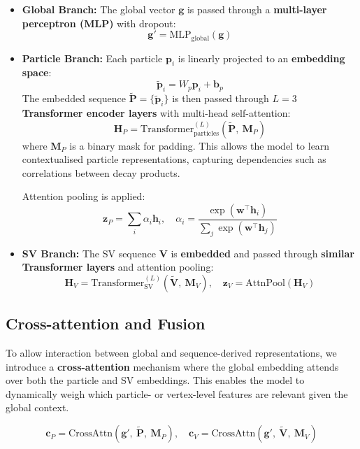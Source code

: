 \documentclass[11pt]{article}
\begin{document}
\begin{itemize}
    \item \textbf{Global Branch:} The global vector \( \mathbf{g} \) is passed through a \textbf{multi-layer perceptron (MLP)} with dropout:
    \[
    \mathbf{g}' = \mathrm{MLP}_{\text{global}}(\mathbf{g})
    \]

    \item \textbf{Particle Branch:} Each particle \( \mathbf{p}_i \) is linearly projected to an \textbf{embedding space}:
    \[
    \tilde{\mathbf{p}}_i = W_p \mathbf{p}_i + \mathbf{b}_p
    \]
    The embedded sequence \( \tilde{\mathbf{P}} = \{\tilde{\mathbf{p}}_i\} \) is then passed through \( L=3 \) \textbf{Transformer encoder layers} with multi-head self-attention:
    \[
    \mathbf{H}_P = \mathrm{Transformer}_{\text{particles}}^{(L)}(\tilde{\mathbf{P}},\ \mathbf{M}_P)
    \]
    where \( \mathbf{M}_P \) is a binary mask for padding. This allows the model to learn contextualised particle representations, capturing dependencies such as correlations between decay products.
    
    
    Attention pooling is applied:
    \[
    \mathbf{z}_P = \sum_{i} \alpha_i \mathbf{h}_i,\quad \alpha_i = \frac{\exp(\mathbf{w}^\top \mathbf{h}_i)}{\sum_j \exp(\mathbf{w}^\top \mathbf{h}_j)}
    \]

    \item \textbf{SV Branch:} The SV sequence \( \mathbf{V} \) is \textbf{embedded} and passed through \textbf{similar Transformer layers} and attention pooling:
    \[
    \mathbf{H}_V = \mathrm{Transformer}_{\text{SV}}^{(L)}(\tilde{\mathbf{V}},\ \mathbf{M}_V),\quad \mathbf{z}_V = \mathrm{AttnPool}(\mathbf{H}_V)
    \]
\end{itemize}




\subsection{Cross-attention and Fusion}

To allow interaction between global and sequence-derived representations, we introduce a \textbf{cross-attention} mechanism where the global embedding attends over both the particle and SV embeddings. This enables the model to dynamically weigh which particle- or vertex-level features are relevant given the global context.

\[
\mathbf{c}_P = \mathrm{CrossAttn}(\mathbf{g}',\ \tilde{\mathbf{P}},\ \mathbf{M}_P), \quad
\mathbf{c}_V = \mathrm{CrossAttn}(\mathbf{g}',\ \tilde{\mathbf{V}},\ \mathbf{M}_V)
\]
\end{document}
